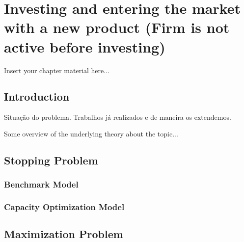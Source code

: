 
\chapter{Investing and entering the market with a new product (Firm is not active before investing)}
\label{chapter:background}

Insert your chapter material here...


\section{Introduction}
\label{section:overview}

Situação do problema.
Trabalhos já realizados e de maneira os extendemos.

Some overview of the underlying theory about the topic...


\section{Stopping Problem}
\label{section:1_theory}



\subsection{Benchmark Model}
\label{subsec:1_bm}

\subsection{Capacity Optimization Model}
\label{subsec:1_com}



\section{Maximization Problem}
\label{section:1_probmax}

